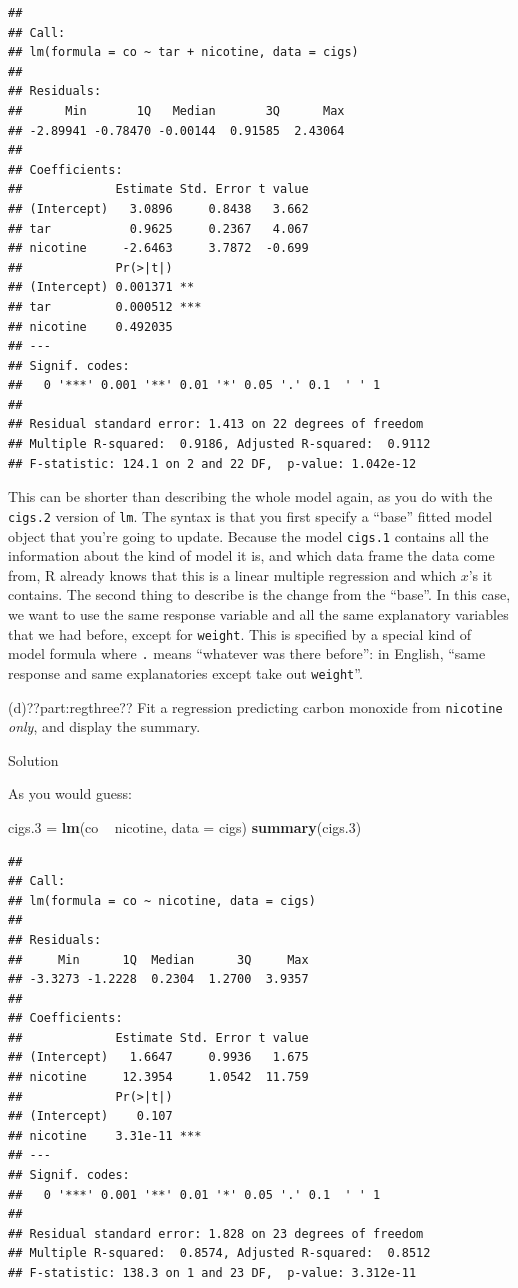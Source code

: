 \documentclass[]{tufte-book}
\newenvironment{Shaded}{}{}
\newcommand{\DataTypeTok}[1]{\textcolor[rgb]{0.56,0.13,0.00}{#1}}
\newcommand{\FloatTok}[1]{\textcolor[rgb]{0.25,0.63,0.44}{#1}}
\newcommand{\KeywordTok}[1]{\textcolor[rgb]{0.00,0.44,0.13}{\textbf{#1}}}
\newcommand{\NormalTok}[1]{#1}
\newcommand{\OperatorTok}[1]{\textcolor[rgb]{0.40,0.40,0.40}{#1}}
\newcommand{\StringTok}[1]{\textcolor[rgb]{0.25,0.44,0.63}{#1}}
\theoremstyle{definition}
\theoremstyle{definition}
\theoremstyle{definition}
\theoremstyle{remark}
\begin{document}
\begin{verbatim}
## 
## Call:
## lm(formula = co ~ tar + nicotine, data = cigs)
## 
## Residuals:
##      Min       1Q   Median       3Q      Max 
## -2.89941 -0.78470 -0.00144  0.91585  2.43064 
## 
## Coefficients:
##             Estimate Std. Error t value
## (Intercept)   3.0896     0.8438   3.662
## tar           0.9625     0.2367   4.067
## nicotine     -2.6463     3.7872  -0.699
##             Pr(>|t|)    
## (Intercept) 0.001371 ** 
## tar         0.000512 ***
## nicotine    0.492035    
## ---
## Signif. codes:  
##   0 '***' 0.001 '**' 0.01 '*' 0.05 '.' 0.1  ' ' 1
## 
## Residual standard error: 1.413 on 22 degrees of freedom
## Multiple R-squared:  0.9186, Adjusted R-squared:  0.9112 
## F-statistic: 124.1 on 2 and 22 DF,  p-value: 1.042e-12
\end{verbatim}

This can be shorter than describing the whole model again, as you do
with the \texttt{cigs.2} version of \texttt{lm}. The syntax is that you
first specify a ``base'' fitted model object that you're going to
update. Because the model \texttt{cigs.1} contains all the information
about the kind of model it is, and which data frame the data come from,
R already knows that this is a linear multiple regression and which
\(x\)'s it contains. The second thing to describe is the change from the
``base''. In this case, we want to use the same response variable and
all the same explanatory variables that we had before, except for
\texttt{weight}. This is specified by a special kind of model formula
where \texttt{.} means ``whatever was there before'': in English, ``same
response and same explanatories except take out \texttt{weight}''.

(d)??part:regthree?? Fit a regression predicting carbon monoxide from
\texttt{nicotine} \emph{only}, and display the summary.

Solution

As you would guess:

\begin{Shaded}
\begin{Highlighting}[]
\NormalTok{cigs}\FloatTok{.3}\NormalTok{ =}\StringTok{ }\KeywordTok{lm}\NormalTok{(co }\OperatorTok{~}\StringTok{ }\NormalTok{nicotine, }\DataTypeTok{data =}\NormalTok{ cigs)}
\KeywordTok{summary}\NormalTok{(cigs}\FloatTok{.3}\NormalTok{)}
\end{Highlighting}
\end{Shaded}

\begin{verbatim}
## 
## Call:
## lm(formula = co ~ nicotine, data = cigs)
## 
## Residuals:
##     Min      1Q  Median      3Q     Max 
## -3.3273 -1.2228  0.2304  1.2700  3.9357 
## 
## Coefficients:
##             Estimate Std. Error t value
## (Intercept)   1.6647     0.9936   1.675
## nicotine     12.3954     1.0542  11.759
##             Pr(>|t|)    
## (Intercept)    0.107    
## nicotine    3.31e-11 ***
## ---
## Signif. codes:  
##   0 '***' 0.001 '**' 0.01 '*' 0.05 '.' 0.1  ' ' 1
## 
## Residual standard error: 1.828 on 23 degrees of freedom
## Multiple R-squared:  0.8574, Adjusted R-squared:  0.8512 
## F-statistic: 138.3 on 1 and 23 DF,  p-value: 3.312e-11
\end{verbatim}
\end{document}

